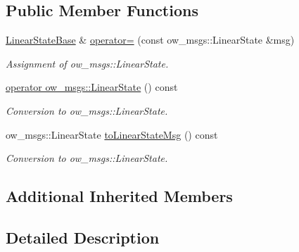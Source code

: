 \subsection*{Public Member Functions}
\begin{DoxyCompactItemize}
\item 
\hyperlink{classow__core_1_1LinearStateBase}{Linear\+State\+Base} \& \hyperlink{classow__core_1_1LinearStateBase_a4347c8037561c50f5b127b81d116d182}{operator=} (const ow\+\_\+msgs\+::\+Linear\+State \&msg)\hypertarget{classow__core_1_1LinearStateBase_a4347c8037561c50f5b127b81d116d182}{}\label{classow__core_1_1LinearStateBase_a4347c8037561c50f5b127b81d116d182}

\begin{DoxyCompactList}\small\item\em Assignment of ow\+\_\+msgs\+::\+Linear\+State. \end{DoxyCompactList}\item 
\hyperlink{classow__core_1_1LinearStateBase_a85bf34df04fe7cf561001d2aa2a589df}{operator ow\+\_\+msgs\+::\+Linear\+State} () const \hypertarget{classow__core_1_1LinearStateBase_a85bf34df04fe7cf561001d2aa2a589df}{}\label{classow__core_1_1LinearStateBase_a85bf34df04fe7cf561001d2aa2a589df}

\begin{DoxyCompactList}\small\item\em Conversion to ow\+\_\+msgs\+::\+Linear\+State. \end{DoxyCompactList}\item 
ow\+\_\+msgs\+::\+Linear\+State \hyperlink{classow__core_1_1LinearStateBase_ab7f4e53b460bbb1c9d7e759efc860d28}{to\+Linear\+State\+Msg} () const \hypertarget{classow__core_1_1LinearStateBase_ab7f4e53b460bbb1c9d7e759efc860d28}{}\label{classow__core_1_1LinearStateBase_ab7f4e53b460bbb1c9d7e759efc860d28}

\begin{DoxyCompactList}\small\item\em Conversion to ow\+\_\+msgs\+::\+Linear\+State. \end{DoxyCompactList}\end{DoxyCompactItemize}
\subsection*{Additional Inherited Members}


\subsection{Detailed Description}
